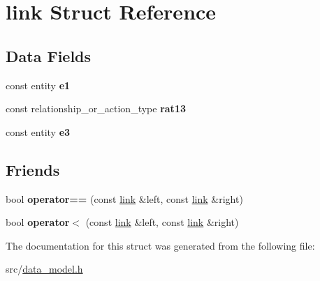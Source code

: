 \hypertarget{structlink}{}\section{link Struct Reference}
\label{structlink}
\subsection*{Data Fields}
\begin{DoxyCompactItemize}
\item 
const entity {\bfseries e1}\hypertarget{structlink_a5a3eda51498d357ce568579c1518ddc0}{}\label{structlink_a5a3eda51498d357ce568579c1518ddc0}

\item 
const relationship\+\_\+or\+\_\+action\+\_\+type {\bfseries rat13}\hypertarget{structlink_a926504798d48f1e25b0c5217ef96bd9a}{}\label{structlink_a926504798d48f1e25b0c5217ef96bd9a}

\item 
const entity {\bfseries e3}\hypertarget{structlink_ab87c26d64d781c9173d767772a45e9f0}{}\label{structlink_ab87c26d64d781c9173d767772a45e9f0}

\end{DoxyCompactItemize}
\subsection*{Friends}
\begin{DoxyCompactItemize}
\item 
bool {\bfseries operator==} (const \hyperlink{structlink}{link} \&left, const \hyperlink{structlink}{link} \&right)\hypertarget{structlink_a383e61e15072ef3fe9e16102dea483e0}{}\label{structlink_a383e61e15072ef3fe9e16102dea483e0}

\item 
bool {\bfseries operator$<$} (const \hyperlink{structlink}{link} \&left, const \hyperlink{structlink}{link} \&right)\hypertarget{structlink_af79bc13140c8180154526642748b0c33}{}\label{structlink_af79bc13140c8180154526642748b0c33}

\end{DoxyCompactItemize}


The documentation for this struct was generated from the following file\+:\begin{DoxyCompactItemize}
\item 
src/\hyperlink{data__model_8h}{data\+\_\+model.\+h}\end{DoxyCompactItemize}
